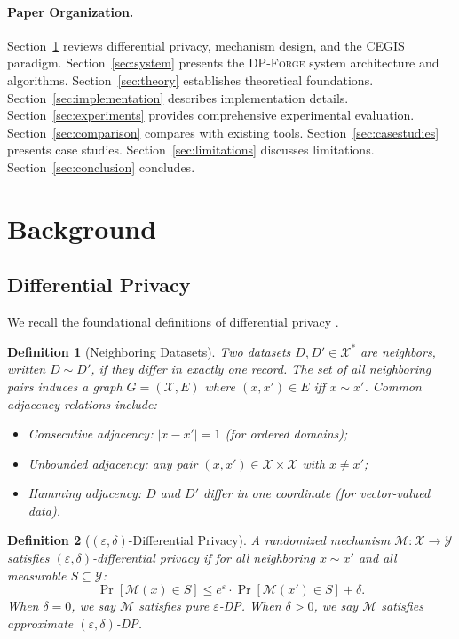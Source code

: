 \documentclass[11pt,a4paper]{article}
\newcommand{\dpforge}{\textsc{DP-Forge}}
\newcommand{\eps}{\varepsilon}
\newcommand{\cM}{\mathcal{M}}
\newcommand{\cX}{\mathcal{X}}
\newcommand{\cY}{\mathcal{Y}}
\newtheorem{definition}{Definition}[section]
\begin{document}
\paragraph{Paper Organization.}
Section~\ref{sec:background} reviews differential privacy, mechanism design, and
the CEGIS paradigm.  Section~\ref{sec:system} presents the \dpforge{} system
architecture and algorithms.  Section~\ref{sec:theory} establishes theoretical
foundations.  Section~\ref{sec:implementation} describes implementation details.
Section~\ref{sec:experiments} provides comprehensive experimental evaluation.
Section~\ref{sec:comparison} compares with existing tools.
Section~\ref{sec:casestudies} presents case studies.
Section~\ref{sec:limitations} discusses limitations.
Section~\ref{sec:conclusion} concludes.


\section{Background}
\label{sec:background}

\subsection{Differential Privacy}
\label{subsec:dp}

We recall the foundational definitions of differential privacy
\cite{dwork2006calibrating,dwork2014algorithmic}.

\begin{definition}[Neighboring Datasets]
\label{def:neighbors}
Two datasets $D, D' \in \cX^*$ are \emph{neighbors}, written $D \sim D'$, if they
differ in exactly one record.  The set of all neighboring pairs induces a graph
$G = (\cX, E)$ where $(x, x') \in E$ iff $x \sim x'$.  Common adjacency
relations include:
\begin{itemize}[nosep]
  \item \emph{Consecutive adjacency}: $|x - x'| = 1$ (for ordered domains);
  \item \emph{Unbounded adjacency}: any pair $(x, x') \in \cX \times \cX$ with $x \ne x'$;
  \item \emph{Hamming adjacency}: $D$ and $D'$ differ in one coordinate (for vector-valued data).
\end{itemize}
\end{definition}

\begin{definition}[$(\eps,\delta)$-Differential Privacy]
\label{def:dp}
A randomized mechanism $\cM: \cX \to \cY$ satisfies $(\eps,\delta)$-differential
privacy if for all neighboring $x \sim x'$ and all measurable $S \subseteq \cY$:
\[
  \Pr[\cM(x) \in S] \le e^{\eps} \cdot \Pr[\cM(x') \in S] + \delta.
\]
When $\delta = 0$, we say $\cM$ satisfies \emph{pure} $\eps$-DP.  When
$\delta > 0$, we say $\cM$ satisfies \emph{approximate} $(\eps,\delta)$-DP.
\end{definition}
\end{document}
